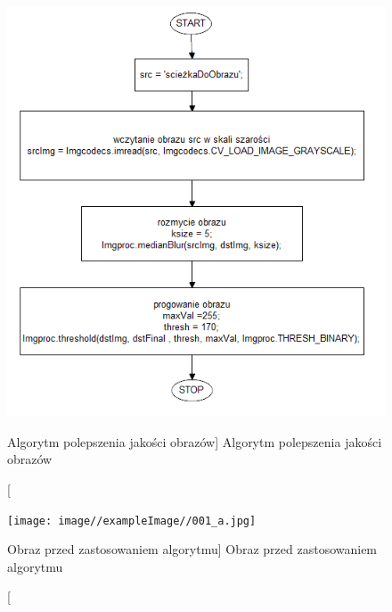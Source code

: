 \documentclass[a4paper,12pt]{article}
\begin{document}
			    \newpage
    		    
    		    \begin{figure}[!ht]  
    			    \begin{center}
    			        \includegraphics[]{image//algorithm//improveImg.png}%
    			    \end{center}
    			    \caption
        			    [Algorytm polepszenia jakości obrazów]  
	    		        {Algorytm polepszenia jakości obrazów} 
	    		        \label{fig:betterImg}
    		    \end{figure}
		
                \newpage
		
    		    \begin{figure}[!ht]  
    			    \begin{center}
    				    \texttt{[image: image//exampleImage//001\_a.jpg]} 
    			    \end{center}
    			    \caption
        			    [Obraz przed zastosowaniem algorytmu]  
                        {Obraz przed zastosowaniem algorytmu}  
    		    \end{figure}
		
\end{document}
